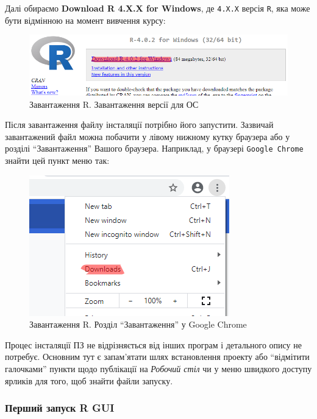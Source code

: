 \documentclass[
]{book}
\begin{document}
Далі обираємо \textbf{Download R 4.X.X for Windows}, де \texttt{4.X.X} версія \texttt{R}, яка може бути відмінною на момент вивчення курсу:

\begin{figure}
\centering
\includegraphics{images/chapter1/r_gui_3.png}
\caption{\label{fig:unnamed-chunk-3}Завантаження R. Завантаження версії для ОС}
\end{figure}

Після завантаження файлу інсталяції потрібно його запустити. Зазвичай завантажений файл можна побачити у лівому нижному кутку браузера або у розділі ``Завантаження'' Вашого браузера. Наприклад, у браузері \texttt{Google\ Chrome} знайти цей пункт меню так:

\begin{figure}
\centering
\includegraphics{images/chapter1/chrome_download_button.png}
\caption{\label{fig:unnamed-chunk-4}Завантаження R. Розділ ``Завантаження'' у Google Chrome}
\end{figure}

Процес інсталяції ПЗ не відрізняється від інших програм і детального опису не потребує. Основним тут є запам'ятати шлях встановлення проекту або ``відмітити галочками'' пункти щодо публікації на \emph{Робочий стіл} чи у меню швидкого доступу ярликів для того, щоб знайти файли запуску.

\hypertarget{chapter1312}{%
\subsubsection{Перший запуск R GUI}\label{chapter1312}}
\end{document}
